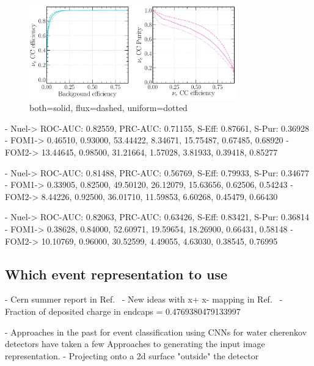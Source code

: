 \begin{figure} %
    \includegraphics[width=0.8\textwidth]{diagrams/7-cvn/chipsnet/sample_nuel_comp_curves.pdf}
    \caption[sample nuel comp curves short]
    {both=solid, flux=dashed, uniform=dotted}
    \label{fig:sample_nuel_comp_curves}
\end{figure}

- Nuel-> ROC-AUC: 0.82559, PRC-AUC: 0.71155, S-Eff: 0.87661, S-Pur: 0.36928
- FOM1-> 0.46510, 0.93000, 53.44422, 8.34671, 15.75487, 0.67485, 0.68920
- FOM2-> 13.44645, 0.98500, 31.21664, 1.57028, 3.81933, 0.39418, 0.85277

- Nuel-> ROC-AUC: 0.81488, PRC-AUC: 0.56769, S-Eff: 0.79933, S-Pur: 0.34677
- FOM1-> 0.33905, 0.82500, 49.50120, 26.12079, 15.63656, 0.62506, 0.54243
- FOM2-> 8.44226, 0.92500, 36.01710, 11.59853, 6.60268, 0.45479, 0.66430

- Nuel-> ROC-AUC: 0.82063, PRC-AUC: 0.63426, S-Eff: 0.83421, S-Pur: 0.36814
- FOM1-> 0.38628, 0.84000, 52.60971, 19.59654, 18.26900, 0.66431, 0.58148
- FOM2-> 10.10769, 0.96000, 30.52599, 4.49055, 4.63030, 0.38545, 0.76995

\subsection{Which event representation to use} %
\label{sec:cvn_baseline_repr} %

- Cern summer report in Ref.~\cite{theodore2016}
- New ideas with x+ x- mapping in Ref.~\cite{berns2020}
- Fraction of deposited charge in endcaps = 0.4769380479133997

- Approaches in the past for event classification using CNNs for water cherenkov detectors have
taken a few Approaches to generating the input image representation.
- Projecting onto a 2d surface "outside" the detector

